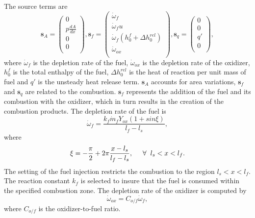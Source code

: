 The source terms are
\begin{equation*}\label{eq:source-terms}
\mathbf{s}_A = \left( \begin{gathered}
0  \\
p \frac{dA}{dx}  \\
0  \\
0 \\
\end{gathered} \right), 
\mathbf{s}_f = \left( \begin{gathered}
{\dot \omega}_f  \\
{\dot \omega}_f u  \\
{\dot \omega}_f \left(h_{0}^{f} + \Delta h_{0}^{rel} \right)  \\
{\dot \omega}_{ox} \\
\end{gathered} \right), 
{\mathbf{s}_q} = \left( \begin{gathered}
0  \\
0  \\
q'  \\
0 \\
\end{gathered} \right),
\end{equation*}
where $\dot{\omega}_f$ is the depletion rate of the fuel, $\dot{\omega}_{ox}$ is the depletion rate of the oxidizer, $h_0^f$ is the total enthalpy of the fuel, $\Delta h_{0}^{rel}$ is the heat of reaction per unit mass of fuel and $q'$ is the unsteady heat release term. $\mathbf{s}_A$ accounts for area variations, $\mathbf{s}_f$ and $\mathbf{s}_q$ are related to the combustion. $\mathbf{s}_f$ represents the addition of the fuel and its combustion with the oxidizer, which in turn results in the creation of the combustion products. The depletion rate of the fuel is
\begin{equation}\label{eq:wf}
\dot{\omega}_{f}= \frac{k_f \dot{m}_f Y_{ox} \left(1+sin\xi\right)}{l_f-l_s},
\end{equation} 
where
\begin{equation*}\label{eq:xi}
\xi= -\frac{\pi}{2} + 2\pi\frac{x-l_s}{l_f-l_s}, \hspace{0.5cm} \forall \hspace{0.2cm} l_s < x < l_f.
\end{equation*}
The setting of the fuel injection restricts the combustion to the region $l_s < x < l_f$. The reaction constant $k_f$ is selected to insure that the fuel is consumed within the specified combustion zone. The depletion rate of the oxidizer is computed by 
\begin{equation*}\label{eq:wox}
\dot{\omega}_{ox} = C_{o/f} \dot{\omega}_f,
\end{equation*}
where $C_{o/f}$ is the oxidizer-to-fuel ratio.

